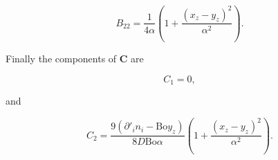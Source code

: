\documentclass[12pt]{article}
\begin{document}
\begin{equation}
\label{equ:B22_spec}
B_{22} = \frac{1}{4 \alpha} \left(1 + \frac{(x_{z} - y_{z})^{2}}{\alpha^{2}} \right).
\end{equation}

Finally the components of $\boldsymbol{C}$ are

\begin{equation}
\label{equ:C1_spec}
C_{1} = 0 ,
\end{equation}

and

\begin{equation}
\label{equ:C2_spec}
C_{2} = \frac{9 (\partial'_{i} n_{i} - \text{Bo} y_{z})}{8 D \text{Bo} \alpha} \left(1 + \frac{(x_{z} - y_{z})^{2}}{\alpha^{2}} \right).
\end{equation}




\end{document}
